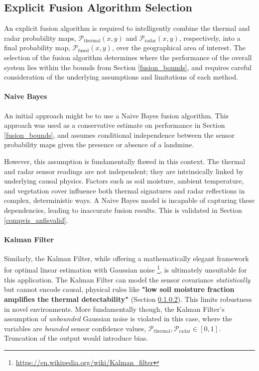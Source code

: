\subsection{Explicit Fusion Algorithm Selection}

        An explicit fusion algorithm is required to intelligently combine the thermal and radar probability maps, \(\mathcal{P}_\text{thermal}(x, y)\) and \(\mathcal{P}_\text{radar}(x, y)\), respectively, into a final probability map, \(\mathcal{P}_\text{fused}(x, y)\), over the geographical area of interest. The selection of the fusion algorithm determines where the performance of the overall system lies within the bounds from Section \ref{fusion_bounds}, and requires careful consideration of the underlying assumptions and limitations of each method.
    
    \paragraph{Naive Bayes}
    
        An initial approach might be to use a Naive Bayes fusion algorithm. This approach was used as a conservative estimate on performance in Section \ref{fusion_bounds}, and assumes conditional independence between the sensor probability maps given the presence or absence of a landmine. 
        
        However, this assumption is fundamentally flawed in this context. The thermal and radar sensor readings are not independent; they are intrinsically linked by underlying causal physics. Factors such as soil moisture, ambient temperature, and vegetation cover influence both thermal signatures and radar reflections in complex, deterministic ways. A Naive Bayes model is incapable of capturing these dependencies, leading to inaccurate fusion results. This is validated in Section \ref{compvis_anfisvalid}.
    
    \paragraph{Kalman Filter}
    
        Similarly, the Kalman Filter, while offering a mathematically elegant framework for optimal linear estimation with Gaussian noise \footnote{\url{https://en.wikipedia.org/wiki/Kalman_filter}}, is ultimately unsuitable for this application. The Kalman Filter can model the sensor covariance \textit{statistically} but cannot encode causal, physical rules like \textbf{"low soil moisture fraction amplifies the thermal detectability"} (Section \ref{}). This limits robustness in novel environments. More fundamentally though, the Kalman Filter's assumption of \textit{unbounded} Gaussian noise is violated in this case, where the variables are \textit{bounded} sensor confidence values, \(\mathcal{P}_{\text{thermal}}, \mathcal{P}_{\text{radar}} \in [0,1]\). Truncation of the output would introduce bias.
    
